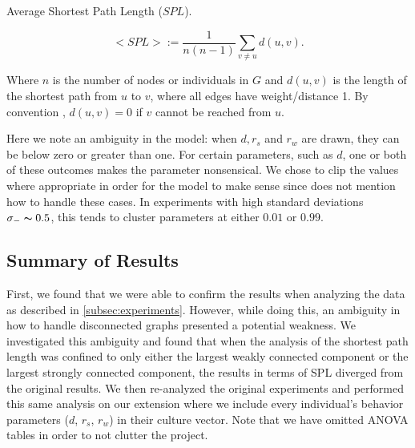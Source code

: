     \begin{defn}{Average Shortest Path Length ($SPL$).}

        \[ <SPL> := \frac{1}{n(n-1)} \sum_{v \neq u} d(u,v).\]

        Where $n$ is the number of nodes or individuals in $G$ and $d(u,v)$ is
        the length of the shortest path from $u$ to $v$, where all edges have
        weight/distance 1.
        By convention \citep{hagberg2008exploring}, $d(u,v)=0$ if $v$ cannot be reached
        from $u$.

    \end{defn}


    Here we note an ambiguity in the model: when $d, r_s$ and $r_w$ are drawn,
    they can be below zero or greater than one. 
    For certain parameters, such as $d$, one or both of these outcomes
    makes the parameter nonsensical.
    We chose to clip the values where appropriate in order for the model to make sense since
    \citep{social-frag} does not mention how to handle these cases.
    In experiments with high standard deviations $\sigma_{-} \thicksim 0.5$,
    this tends to cluster parameters at either $0.01$ or $0.99$.



\subsection{Summary of Results}\label{subsec:summary}
    First, we found that we were able to confirm the results when analyzing the data
    as described in \ref{subsec:experiments}.
    However, while doing this, an ambiguity in how to handle
    disconnected graphs presented a potential weakness.
    We investigated this ambiguity and found that when the analysis of the
    shortest path length was confined to only either the largest weakly
    connected component or the largest strongly connected component, the results
    in terms of SPL diverged from the original results.
    We then re-analyzed the original experiments and performed this same analysis
    on our extension where we include every individual's behavior parameters
    ($d$, $r_s$, $r_w$) in their culture vector. Note that we have omitted ANOVA 
    tables in order to not clutter the project.
